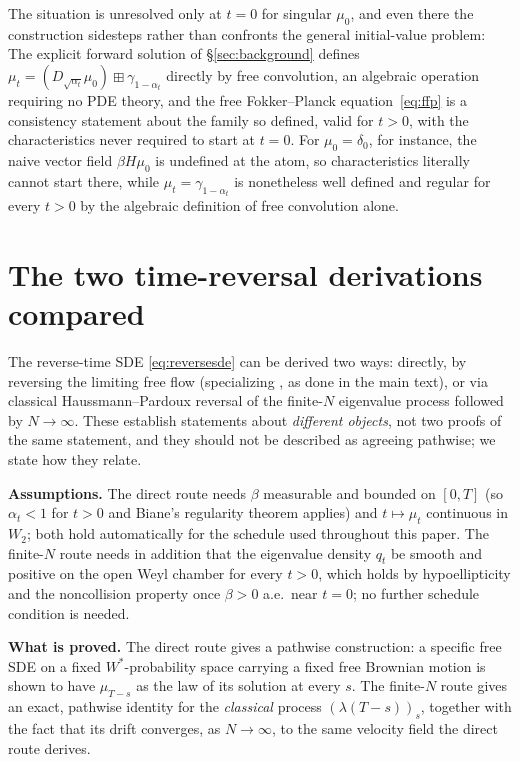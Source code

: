 \documentclass[11pt]{article}
\newcommand{\Wt}{W_{2}}
\theoremstyle{plain}
\theoremstyle{definition}
\theoremstyle{remark}
\begin{document}
The situation is unresolved only at $t=0$ for singular $\mu_0$, and even there the
construction sidesteps rather than confronts the general initial-value problem:
The explicit forward solution of \S\ref{sec:background} defines $\mu_t=(D_{\sqrt{\alpha_t}}\mu_0)\boxplus
\gamma_{1-\alpha_t}$ directly by free convolution, an algebraic operation requiring
no PDE theory, and the free Fokker--Planck equation~\eqref{eq:ffp} is a consistency statement about the family
so defined, valid for $t>0$, with the characteristics never required to start at
$t=0$. For $\mu_0=\delta_0$, for instance, the naive vector field $\beta H\mu_0$ is
undefined at the atom, so characteristics literally cannot start there, while
$\mu_t=\gamma_{1-\alpha_t}$ is nonetheless well defined and regular for every $t>0$
by the algebraic definition of free convolution alone.

\section{The two time-reversal derivations compared}\label{app:tworoutes}

The reverse-time SDE \eqref{eq:reversesde} can be derived two ways: directly, by
reversing the limiting free flow (specializing \citet{Dabrowski2014}, as done in the
main text), or via classical Haussmann--Pardoux reversal of the finite-$N$ eigenvalue
process followed by $N\to\infty$. These establish statements about \emph{different
objects}, not two proofs of the same statement, and they should not be described
as agreeing pathwise; we state how they relate.

\textbf{Assumptions.} The direct route needs $\beta$ measurable and bounded on
$[0,T]$ (so $\alpha_t<1$ for $t>0$ and Biane's regularity theorem applies) and
$t\mapsto\mu_t$ continuous in $\Wt$; both hold automatically for the schedule used
throughout this paper. The finite-$N$ route needs in addition that the eigenvalue
density $q_t$ be smooth and positive on the open Weyl chamber for every $t>0$, which
holds by hypoellipticity and the noncollision property once $\beta>0$ a.e.\ near
$t=0$; no further schedule condition is needed.

\textbf{What is proved.} The direct route gives a pathwise construction: a specific
free SDE on a fixed $W^*$-probability space carrying a fixed free Brownian motion is
shown to have $\mu_{T-s}$ as the law of its solution at every $s$. The finite-$N$
route gives an exact, pathwise identity for the \emph{classical} process
$(\lambda(T-s))_s$, together with the fact that its drift converges, as
$N\to\infty$, to the same velocity field the direct route derives.
\end{document}
